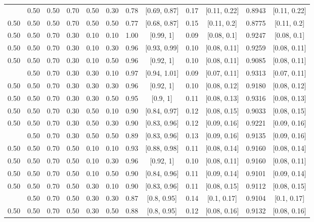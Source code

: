 \documentclass[
  11pt,
]{article}
\begin{document}
\begin{landscape}
\begin{ThreePartTable}
\begin{longtable}[t]{cccccccccccc}
\addlinespace
0.50 & 0.50 & 0.50 & 0.70 & 0.50 & 0.30 & 0.78 & {}[0.69, 0.87] & 0.17 & {}[0.11, 0.22] & 0.8943 & {}[0.11, 0.22]\\
0.50 & 0.50 & 0.50 & 0.70 & 0.50 & 0.50 & 0.77 & {}[0.68, 0.87] & 0.15 & {}[0.11, 0.2] & 0.8775 & {}[0.11, 0.2]\\
0.50 & 0.50 & 0.70 & 0.30 & 0.10 & 0.10 & 1.00 & {}[0.99, 1] & 0.09 & {}[0.08, 0.1] & 0.9247 & {}[0.08, 0.1]\\
0.50 & 0.50 & 0.70 & 0.30 & 0.10 & 0.30 & 0.96 & {}[0.93, 0.99] & 0.10 & {}[0.08, 0.11] & 0.9259 & {}[0.08, 0.11]\\
0.50 & 0.50 & 0.70 & 0.30 & 0.10 & 0.50 & 0.96 & {}[0.92, 1] & 0.10 & {}[0.08, 0.11] & 0.9085 & {}[0.08, 0.11]\\
\addlinespace
0.50 & 0.50 & 0.70 & 0.30 & 0.30 & 0.10 & 0.97 & {}[0.94, 1.01] & 0.09 & {}[0.07, 0.11] & 0.9313 & {}[0.07, 0.11]\\
0.50 & 0.50 & 0.70 & 0.30 & 0.30 & 0.30 & 0.96 & {}[0.92, 1] & 0.10 & {}[0.08, 0.12] & 0.9180 & {}[0.08, 0.12]\\
0.50 & 0.50 & 0.70 & 0.30 & 0.30 & 0.50 & 0.95 & {}[0.9, 1] & 0.11 & {}[0.08, 0.13] & 0.9316 & {}[0.08, 0.13]\\
0.50 & 0.50 & 0.70 & 0.30 & 0.50 & 0.10 & 0.90 & {}[0.84, 0.97] & 0.12 & {}[0.08, 0.15] & 0.9033 & {}[0.08, 0.15]\\
0.50 & 0.50 & 0.70 & 0.30 & 0.50 & 0.30 & 0.90 & {}[0.83, 0.96] & 0.12 & {}[0.09, 0.16] & 0.9221 & {}[0.09, 0.16]\\
\addlinespace
0.50 & 0.50 & 0.70 & 0.30 & 0.50 & 0.50 & 0.89 & {}[0.83, 0.96] & 0.13 & {}[0.09, 0.16] & 0.9135 & {}[0.09, 0.16]\\
0.50 & 0.50 & 0.70 & 0.50 & 0.10 & 0.10 & 0.93 & {}[0.88, 0.98] & 0.11 & {}[0.08, 0.14] & 0.9160 & {}[0.08, 0.14]\\
0.50 & 0.50 & 0.70 & 0.50 & 0.10 & 0.30 & 0.96 & {}[0.92, 1] & 0.10 & {}[0.08, 0.11] & 0.9160 & {}[0.08, 0.11]\\
0.50 & 0.50 & 0.70 & 0.50 & 0.10 & 0.50 & 0.90 & {}[0.84, 0.96] & 0.11 & {}[0.09, 0.14] & 0.9101 & {}[0.09, 0.14]\\
0.50 & 0.50 & 0.70 & 0.50 & 0.30 & 0.10 & 0.90 & {}[0.83, 0.96] & 0.11 & {}[0.08, 0.15] & 0.9112 & {}[0.08, 0.15]\\
\addlinespace
0.50 & 0.50 & 0.70 & 0.50 & 0.30 & 0.30 & 0.87 & {}[0.8, 0.95] & 0.14 & {}[0.1, 0.17] & 0.9104 & {}[0.1, 0.17]\\
0.50 & 0.50 & 0.70 & 0.50 & 0.30 & 0.50 & 0.88 & {}[0.8, 0.95] & 0.12 & {}[0.08, 0.16] & 0.9132 & {}[0.08, 0.16]\\

\end{longtable}
\end{ThreePartTable}
\end{landscape}
\end{document}
